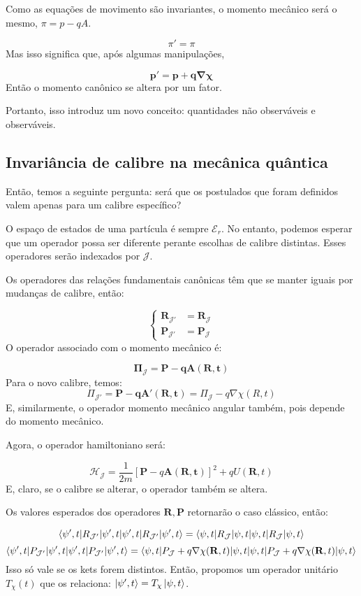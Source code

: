 \documentclass{article}
\begin{document}
	Como as equações de movimento são invariantes, o momento mecânico será o mesmo, $\pi=p-qA$.
	
	$$\pi'=\pi$$
	Mas isso significa que, após algumas manipulações,
	
	$$\mathbf{p'=p+q\nabla \chi}$$
	Então o momento canônico se altera por um fator.
	
	Portanto, isso introduz um novo conceito: quantidades não observáveis e observáveis.
	
	\subsection{Invariância de calibre na mecânica quântica}
	
	Então, temos a seguinte pergunta: será que os postulados que foram definidos valem apenas para um calibre específico?
	
	O espaço de estados de uma partícula é sempre $\mathcal{E}_{r}$. No entanto, podemos esperar que um operador possa ser diferente perante escolhas de calibre distintas. Esses operadores serão indexados por $\mathcal{J}$.
	
	Os operadores das relações fundamentais canônicas têm que se manter iguais por mudanças de calibre, então:
	
	$$
	\left\{\begin{aligned}
		\mathbf{R}_{\mathcal{J'}} &= \mathbf{R}_{\mathcal{J}} \\
		\mathbf{P}_{\mathcal{J'}} &= \mathbf{P}_{\mathcal{J}}
	\end{aligned}\right.
	$$
	O operador associado com o momento mecânico é:
	
	$$\mathbf{\Pi}_{\mathcal{J}}=\mathbf{P-qA(R,t)}$$
	Para o novo calibre, temos:
	$$\Pi_{\mathcal{J'}}=\mathbf{P-qA'(R,t)}=\Pi_{\mathcal{J}}-q\nabla \chi(R,t)$$
	E, similarmente, o operador momento mecânico angular também, pois depende do momento mecânico.
	
	Agora, o operador hamiltoniano será:
	
	$$\mathcal{H}_{\mathcal{J}}= \frac{1}{2m}\left[ \mathbf{P}-q\mathbf{A(R,t)} \right]^{2}+qU(\mathbf{R},t) $$
	E, claro, se o calibre se alterar, o operador também se altera.
	
	Os valores esperados dos operadores $\mathbf{R,P}$ retornarão o caso clássico, então:
	
	$$\braket{ \psi',t |R_{\mathcal{J'}}|\psi',t  } = \braket{ \psi,t |R_{\mathcal{J}}|\psi,t  }$$
	$$\braket{ \psi',t |P_{\mathcal{J'}}|\psi',t  } = \braket{ \psi,t |P_{\mathcal{J}}+q\nabla \chi(\mathbf{R},t)|\psi,t  }$$
	Isso só vale se os kets forem distintos. Então, propomos um operador unitário $T_{\chi}(t)$ que os relaciona: $\ket{\psi',t}=T_{\chi}\ket{\psi,t}$.
	
\end{document}
